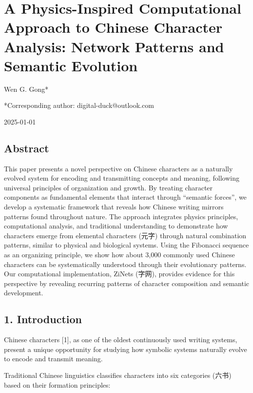 \documentclass[
  11pt,
  letterpaper,
]{article}
\author{}
\date{}
\begin{document}
\section{A Physics-Inspired Computational Approach to Chinese Character
Analysis: Network Patterns and Semantic
Evolution}\label{a-physics-inspired-computational-approach-to-chinese-character-analysis-network-patterns-and-semantic-evolution}

Wen G. Gong*

*Corresponding author: digital-duck@outlook.com

2025-01-01

\subsection{Abstract}\label{abstract}

This paper presents a novel perspective on Chinese characters as a
naturally evolved system for encoding and transmitting concepts and
meaning, following universal principles of organization and growth. By
treating character components as fundamental elements that interact
through ``semantic forces'', we develop a systematic framework that
reveals how Chinese writing mirrors patterns found throughout nature.
The approach integrates physics principles, computational analysis, and
traditional understanding to demonstrate how characters emerge from
elemental characters (元字) through natural combination patterns,
similar to physical and biological systems. Using the Fibonacci sequence
as an organizing principle, we show how about 3,000 commonly used
Chinese characters can be systematically understood through their
evolutionary patterns. Our computational implementation, ZiNets (字网),
provides evidence for this perspective by revealing recurring patterns
of character composition and semantic development.

\subsection{1. Introduction}\label{introduction}

Chinese characters {[}1{]}, as one of the oldest continuously used
writing systems, present a unique opportunity for studying how symbolic
systems naturally evolve to encode and transmit meaning.

Traditional Chinese linguistics classifies characters into six
categories (六书) based on their formation principles:
\end{document}
